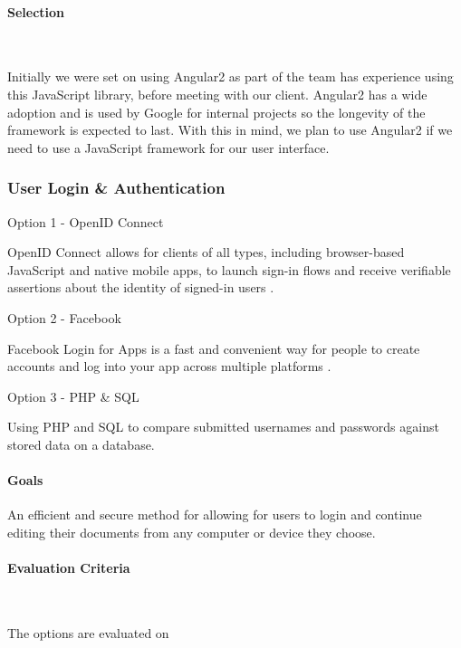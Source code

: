 \documentclass[letterpaper, 10pt, draftclsnofoot, compsoc, onecolumn]{IEEEtran}
\begin{document}
{\medskip
\paragraph{Selection} ~\\
{\noindent Initially we were set on using Angular2 as part of the team has experience using this JavaScript library, before meeting with our client. Angular2 has a wide adoption and is used by Google for internal projects so the longevity of the framework is expected to last. With this in mind, we plan to use Angular2 if we need to use a JavaScript framework for our user interface. \par}




\newpage
\subsubsection{User Login \& Authentication}
{\noindent Option 1 - OpenID Connect \par}
{\noindent OpenID Connect allows for clients of all types, including browser-based JavaScript and native mobile apps, to launch sign-in flows and receive verifiable assertions about the identity of signed-in users \cite{OpenID}. \par}

\medskip
{\noindent Option 2 - Facebook  \par}
{\noindent Facebook Login for Apps is a fast and convenient way for people to create accounts and log into your app across multiple platforms \cite{Facebook}. \par}

\medskip
{\noindent Option 3 - PHP \& SQL\par}
{\noindent Using PHP and SQL to compare submitted usernames and passwords against stored data on a database.\par}

\medskip
\paragraph{Goals}
{\noindent An efficient and secure method for allowing for users to login and continue editing their documents from any computer or device they choose.\par}

\medskip
\paragraph{Evaluation Criteria} ~\\
{\noindent The options are evaluated on

}}
\end{document}
